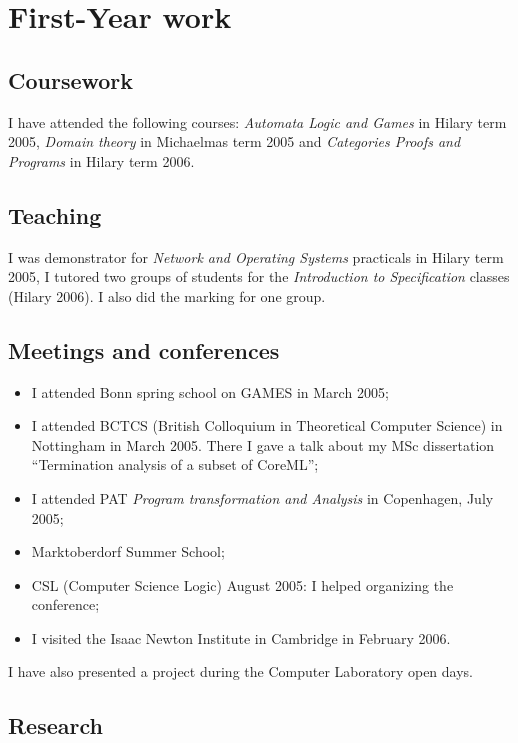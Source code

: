 \chapter{First-Year work}

\section{Coursework}
I have attended the following courses: \emph{Automata Logic and
Games} in Hilary term 2005, \emph{Domain theory} in Michaelmas term
2005 and \emph{Categories Proofs and Programs} in Hilary term 2006.

\section{Teaching}

I was demonstrator for \emph{Network and Operating Systems}
practicals in Hilary term 2005, I tutored two groups of students for
the \emph{Introduction to Specification} classes (Hilary 2006). I
also did the marking for one group.

\section{Meetings and conferences}
\begin{itemize}
\item I attended Bonn spring school on GAMES in March 2005;

\item  I attended BCTCS (British Colloquium in
Theoretical Computer Science) in Nottingham in March 2005. There I
gave a talk about my MSc dissertation ``Termination analysis of a
subset of CoreML'';

\item I attended PAT \emph{Program transformation and Analysis} in Copenhagen, July 2005;

\item Marktoberdorf Summer School;
\item CSL (Computer Science Logic) August 2005:
I helped organizing the conference;
\item I visited the Isaac Newton Institute in Cambridge in February
2006.
\end{itemize}
I have also presented a project during the Computer Laboratory open
days.


\section{Research}

